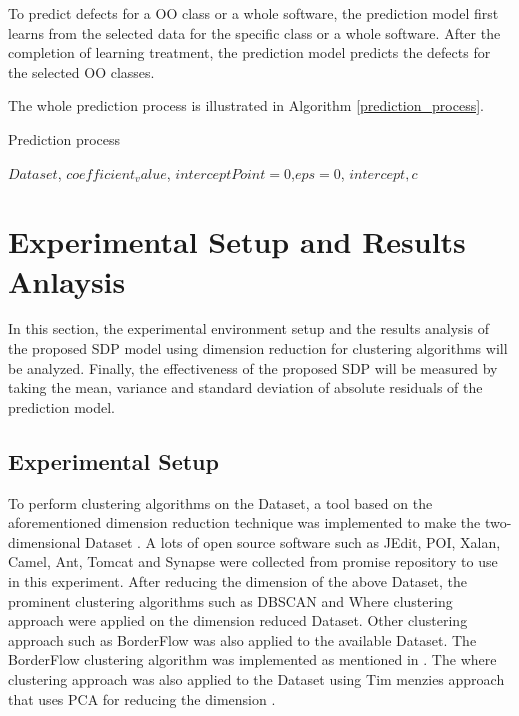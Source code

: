 \documentclass[12pt]{report}
\begin{document}
To predict defects for a OO class or a whole software, the prediction model first learns from the selected data for the specific class or a whole software. After the completion of learning treatment, the prediction model predicts the defects for the selected OO classes.

The whole prediction process is illustrated in Algorithm \ref{prediction_process}.

\begin{algorithm}
	\caption{Prediction process}
	\label{prediction_process}
		\begin{algorithmic}[1]
			\REQUIRE  $ Dataset$, $coefficient_value$, $interceptPoint=0$,$eps=0$, $intercept, c$
			
			\ENDFOR
		\end{algorithmic}
	\end{algorithm}

\section{Experimental Setup and Results Anlaysis}

In this section, the experimental environment setup and the results analysis of the proposed SDP model using dimension reduction for clustering algorithms will be analyzed. Finally, the effectiveness of the proposed SDP will be measured by taking the mean, variance and standard deviation of absolute residuals of the prediction model. 

\subsection{Experimental Setup}

To perform clustering algorithms on the Dataset, a tool based on the aforementioned dimension reduction technique was implemented to make the two-dimensional Dataset . A lots of open source software such as JEdit, POI, Xalan, Camel, Ant, Tomcat and Synapse were collected from promise repository \cite{promise12} to use in this experiment. After reducing the dimension of the above Dataset, the prominent clustering algorithms such as DBSCAN and  Where clustering approach were applied on the dimension reduced Dataset. Other clustering approach such as BorderFlow was also applied to the available Dataset. The BorderFlow clustering algorithm was implemented as mentioned in \cite{scanniello2013class}. The where clustering approach was also applied to the Dataset using Tim menzies approach that uses PCA for reducing the dimension \cite{menzies2011local,menzies2013local}.
 
\end{document}
